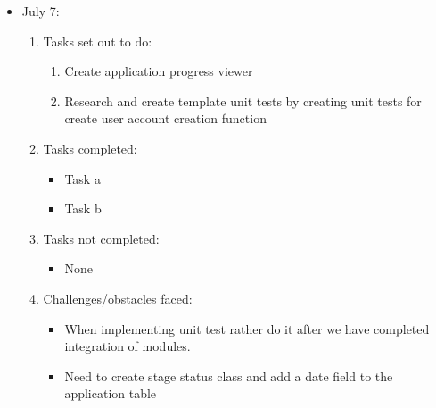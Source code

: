 \documentclass[12pt]{article}
\begin{document}
	\begin{itemize}
		\item July 7:
		\begin{enumerate}
			\item Tasks set out to do:
			\begin{enumerate}
				\item Create application progress viewer
				\item Research and create template unit tests by creating unit tests for create user account creation function
			\end{enumerate}
			\item Tasks completed:
			\begin{itemize}
				\item Task a
				\item Task b
			\end{itemize}
			\item Tasks not completed:
			\begin{itemize}
				\item None
			\end{itemize}
			\item Challenges/obstacles faced:
			\begin{itemize}
				\item When implementing unit test rather do it after we have completed integration of modules.
				\item Need to create stage status class and add a date field to the application table
			\end{itemize}			
		\end{enumerate}
	\end{itemize}
	
\end{document}
